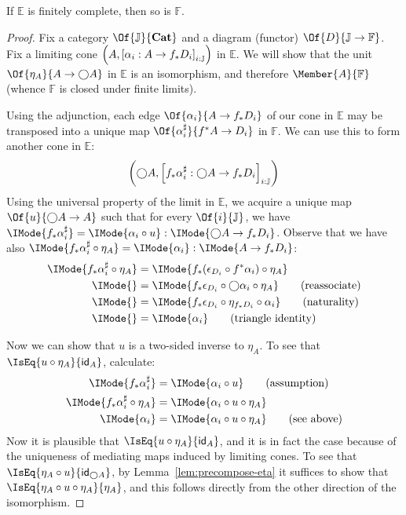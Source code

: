 \documentclass{article}
\newcommand\AIsEq[2]{\IMode{#1} &=\IMode{#2}}
\newcommand\Cats{\mathbf{Cat}}
\newcommand\ArrId[1]{\mathsf{id}_{#1}}
\newcommand\IsEqOf[3]{\IMode{#1}=\IMode{#2}:\IMode{#3}}
\begin{document}
\begin{lem}
  If $\mathbb{E}$ is finitely complete, then so is $\mathbb{F}$.
\end{lem}
\begin{proof}
  Fix a category $\Of{\mathbb{J}}{\Cats}$ and a diagram (functor)
  $\Of{D}{\mathbb{J}\to\mathbb{F}}$. Fix a limiting cone
  $\left(A,{\left[\alpha_i:A\to f_*D_i\right]}_{i:\mathbb{J}}\right)$ in $\mathbb{E}$.
  We will show that the unit $\Of{\eta_A}{A\to \bigcirc A}$ in
  $\mathbb{E}$ is an isomorphism, and therefore
  $\Member{A}{\mathbb{F}}$ (whence $\mathbb{F}$ is closed under finite
  limits).

  Using the adjunction, each edge $\Of{\alpha_i}{A\to f_*D_i}$ of our
  cone in $\mathbb{E}$ may be transposed into a unique map
  $\Of{\alpha_i^\sharp}{f^*A\to D_i}$ in $\mathbb{F}$.
%
  We can use this to form another cone in $\mathbb{E}$:
  \[
    \left(\bigcirc A,{\left[f_*\alpha_i^\sharp:\bigcirc A\to f_*D_i\right]}_{i:\mathbb{J}}\right)
  \]
  Using the universal property of the limit in $\mathbb{E}$, we
  acquire a unique map $\Of{u}{\bigcirc A\to A}$ such that for every
  $\Of{i}{\mathbb{J}}$, we have
  $\IsEqOf{f_*\alpha_i^\sharp}{\alpha_i\circ u}{\bigcirc A\to
    f_*D_i}$.
%
  Observe that we have also
  $\IsEqOf{f_*\alpha_i^\sharp\circ\eta_A}{\alpha_i}{A\to f_*D_i}$:
  \begin{align*}
    \AIsEq{
      f_*\alpha_i^\sharp\circ\eta_A
    }{
      f_*(\epsilon_{D_i}\circ f^*\alpha_i)\circ\eta_A
    }
    \\
    \AIsEq{
    }{
      f_*\epsilon_{D_i}\circ\bigcirc\alpha_i\circ\eta_A
    }\tag{reassociate}
    \\
    \AIsEq{
    }{
      f_*\epsilon_{D_i}\circ\eta_{f_*D_i}\circ\alpha_i
    }\tag{naturality}
    \\
    \AIsEq{
    }{
      \alpha_i
    }\tag{triangle identity}
  \end{align*}

  Now we can show that $u$ is a two-sided inverse to $\eta_A$. To see
  that $\IsEq{u\circ\eta_A}{\ArrId{A}}$, calculate:
  \begin{align*}
    \AIsEq{
      f_*\alpha_i^\sharp
    }{
      \alpha_i\circ u
    }\tag{assumption}
    \\
    \AIsEq{
      f_*\alpha_i^\sharp\circ \eta_A
    }{
      \alpha_i\circ u\circ\eta_A
    }
    \\
    \AIsEq{
      \alpha_i
    }{
      \alpha_i\circ u\circ\eta_A
    }\tag{see above}
  \end{align*}
  Now it is plausible that $\IsEq{u\circ\eta_A}{\ArrId{A}}$, and it is
  in fact the case because of the uniqueness of mediating maps induced
  by limiting cones.
%
  To see that $\IsEq{\eta_A\circ u}{\ArrId{\bigcirc A}}$, by
  Lemma~\ref{lem:precompose-eta} it suffices to show that
  $\IsEq{\eta_A\circ u\circ\eta_A}{\eta_A}$, and this follows directly
  from the other direction of the isomorphism.


\end{proof}
\end{document}
